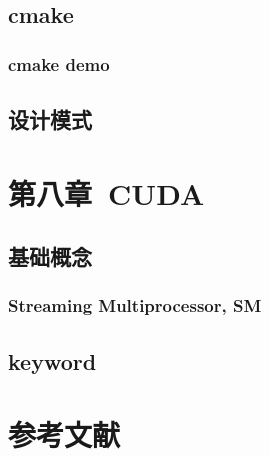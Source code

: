 \documentclass[12pt]{book}
\begin{document}
\section{cmake}
\subsection{cmake demo}
\section{设计模式}

\newpage

\fancyhead{}

\chapter{第八章\ CUDA}

\section{基础概念}
\subsection{Streaming Multiprocessor, SM}

\section{keyword}
\newpage
 
\fancyhead{}
 

 
\chapter{参考文献}


 
\end{document}
